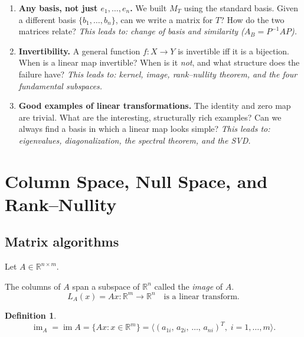 \documentclass[11pt]{article}
\theoremstyle{definition}
\newtheorem{definition}{Definition}[section]
\theoremstyle{plain}
\begin{document}
\begin{enumerate}
  \item \textbf{Any basis, not just $e_1,\ldots,e_n$.}
    We built $M_T$ using the standard basis.  Given a different basis
    $\{b_1,\ldots,b_n\}$, can we write a matrix for $T$?  How do the
    two matrices relate?
    \textit{This leads to: change of basis and similarity
    ($A_B = P^{-1}AP$).}

  \item \textbf{Invertibility.}
    A general function $f:X\to Y$ is invertible iff it is a bijection.
    When is a linear map invertible?  When is it \emph{not}, and what
    structure does the failure have?
    \textit{This leads to: kernel, image, rank--nullity theorem, and
    the four fundamental subspaces.}

  \item \textbf{Good examples of linear transformations.}
    The identity and zero map are trivial.  What are the interesting,
    structurally rich examples?  Can we always find a basis in which a
    linear map looks simple?
    \textit{This leads to: eigenvalues, diagonalization, the spectral
    theorem, and the SVD.}
\end{enumerate}

\section{Column Space, Null Space, and Rank--Nullity}

\subsection{Matrix algorithms}

Let $A \in \mathbb{R}^{n \times m}$.

The columns of $A$ span a subspace of $\mathbb{R}^n$ called the \emph{image} of $A$.
\[
  L_A(x) = Ax : \mathbb{R}^m \longrightarrow \mathbb{R}^n
  \quad\text{is a linear transform.}
\]

\begin{definition}
  \[
    \operatorname{im}_A = \operatorname{im} A
    = \{Ax : x \in \mathbb{R}^m\}
    = \bigl\langle (a_{1i},\, a_{2i},\, \ldots,\, a_{ni})^T,\; i = 1,\ldots,m \bigr\rangle.
  \]
\end{definition}
\end{document}
